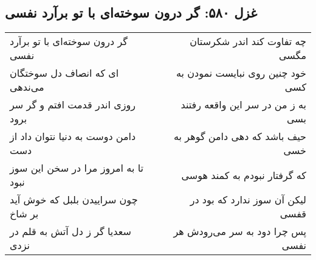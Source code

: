 \begin{center}
\section*{غزل ۵۸۰: گر درون سوخته‌ای با تو برآرد نفسی}
\label{sec:580}
\begin{longtable}{l p{0.5cm} r}
گر درون سوخته‌ای با تو برآرد نفسی
&&
چه تفاوت کند اندر شکرستان مگسی
\\
ای که انصاف دل سوختگان می‌ندهی
&&
خود چنین روی نبایست نمودن به کسی
\\
روزی اندر قدمت افتم و گر سر برود
&&
به ز من در سر این واقعه رفتند بسی
\\
دامن دوست به دنیا نتوان داد از دست
&&
حیف باشد که دهی دامن گوهر به خسی
\\
تا به امروز مرا در سخن این سوز نبود
&&
که گرفتار نبودم به کمند هوسی
\\
چون سراییدن بلبل که خوش آید بر شاخ
&&
لیکن آن سوز ندارد که بود در قفسی
\\
سعدیا گر ز دل آتش به قلم در نزدی
&&
پس چرا دود به سر می‌رودش هر نفسی
\\
\end{longtable}
\end{center}
